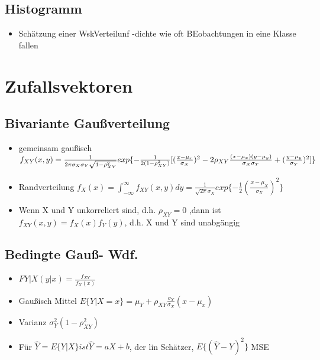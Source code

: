 \documentclass{article}
\begin{document}
\subsection{Histogramm}
\begin{itemize}
\item Schätzung einer WskVerteilunf -dichte wie oft BEobachtungen in eine Klasse fallen
\end{itemize}

\section{Zufallsvektoren}
\subsection{Bivariante Gau\ss verteilung}
\begin{itemize}
\item gemeinsam gau\ss isch $f_{XY}(x,y) = \\
 \frac{1}{2\pi\sigma_X\sigma_Y \sqrt{1-\rho_{XY}^2}} exp\{- \frac{1}{2(1-\rho_{XY}^2)} [(\frac{x-\mu_x}{\sigma_X})^2 - 2\rho_{XY} \frac{(x-\mu_x)(y-\mu_y)}{\sigma_X\sigma_Y}+(\frac{y-\mu_y}{\sigma_Y})^2] \}$
\item Randverteilung $f_X(x) = \int_{-\infty}^{\infty} f_{XY}(x,y) dy = \frac{1}{\sqrt{2\pi}\sigma_X} exp\{ - \frac{1}{2} (\frac{x-\mu_X}{\sigma_X})^2\}$
\item Wenn X und Y unkorreliert sind, d.h. $\rho_{XY} = 0$ ,dann ist $f_{XY}(x,y) = f_X(x)f_Y(y)$, d.h. X und Y sind unabgängig
\end{itemize}

\subsection{Bedingte Gau\ss - Wdf.}
\begin{itemize}
\item$F{Y|X}(y|x) = \frac{f_{XY}}{f_X(x)}$
\item Gau\ss isch Mittel  $E\{Y|X=x\} = \mu_Y + \rho_{XY} \frac{\sigma_Y}{\sigma_X}(x-\mu_x)$
\item Varianz $\sigma_Y^2(1-\rho_{XY}^2)$
\item Für $\hat{Y} = E\{Y|X\} ist \hat{Y} = aX+b$, der lin Schätzer, $E\{(\hat{Y}-Y)^2\}$ MSE
\end{itemize}
\end{document}
